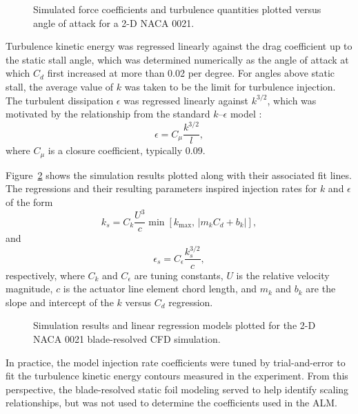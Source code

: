 \begin{figure}
    \centering
    
    \caption{Simulated force coefficients and turbulence quantities plotted
        versus angle of attack for a 2-D NACA 0021.}
    
    \label{fig:NACA-foil-coeffs}
\end{figure}

Turbulence kinetic energy was regressed linearly against the drag coefficient up
to the static stall angle, which was determined numerically as the angle of
attack at which $C_d$ first increased at more than 0.02 per degree. For angles
above static stall, the average value of $k$ was taken to be the limit for
turbulence injection. The turbulent dissipation $\epsilon$ was regressed
linearly against $k^{3/2}$, which was motivated by the relationship from the
standard $k$--$\epsilon$ model \cite{Wilcox1994}:
\begin{equation}
    \epsilon = C_\mu \frac{k^{3/2}}{l},
\end{equation}
where $C_\mu$ is a closure coefficient, typically 0.09.

Figure~\ref{fig:NACA-foil-fits} shows the simulation results plotted along with
their associated fit lines. The regressions and their resulting parameters
inspired injection rates for $k$ and $\epsilon$ of the form
\begin{equation}
    k_s = C_k \frac{U^3}{c} \min \left[ k_{\max} ,\, | m_k C_d +
    b_k | \right],
\end{equation}
and
\begin{equation}
    \epsilon_s = C_\epsilon \frac{k_s^{3/2}}{c},
\end{equation}
respectively, where $C_k$ and $C_\epsilon$ are tuning constants, $U$ is the
relative velocity magnitude, $c$ is the actuator line element chord length, and
$m_k$ and $b_k$ are the slope and intercept of the $k$ versus $C_d$ regression.

\begin{figure}
    \centering 
    
    \caption{Simulation results and linear regression models plotted for the 2-D
        NACA 0021 blade-resolved CFD simulation.}
    
    \label{fig:NACA-foil-fits}
\end{figure}

In practice, the model injection rate coefficients were tuned by trial-and-error
to fit the turbulence kinetic energy contours measured in the experiment. From
this perspective, the blade-resolved static foil modeling served to help
identify scaling relationships, but was not used to determine the coefficients
used in the ALM.
